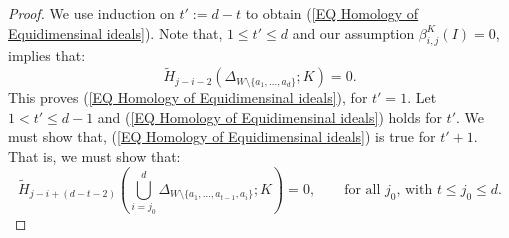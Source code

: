 \documentclass[a4paper,11pt]{amsart}
\theoremstyle{plain}
\theoremstyle{definition}
\theoremstyle{remark}
\begin{document}
\begin{proof}
	We use induction on $t':=d-t$ to obtain (\ref{EQ Homology of Equidimensinal ideals}). Note that, $1 \leq t' \leq d$ and our assumption $\beta^K_{i,j}(I)=0$, implies that:
	\begin{equation*}
	\tilde{H}_{j-i-2}\left( \Delta_{W \setminus \{a_1, \ldots, a_d\}};K\right) =0.
	\end{equation*}
	This proves (\ref{EQ Homology of Equidimensinal ideals}), for $t'=1$. Let $1<t' \leq d-1$ and (\ref{EQ Homology of Equidimensinal ideals}) holds for $t'$. We must show that, (\ref{EQ Homology of Equidimensinal ideals}) is true for $t'+1$. That is, we must show that:
	\begin{equation} \label{EQ2 Homology of Equidimensinal ideals}
	\tilde{H}_{j-i+(d-t-2)} \left( \bigcup\limits_{i={j_0}}^{d} \Delta_{W \setminus \{a_1, \ldots, a_{t-1}, a_i\}} ;K \right) =0, \qquad \text{for all $j_0$, with } t \leq j_0 \leq d. 
	\end{equation}
	

\end{proof}
\end{document}

